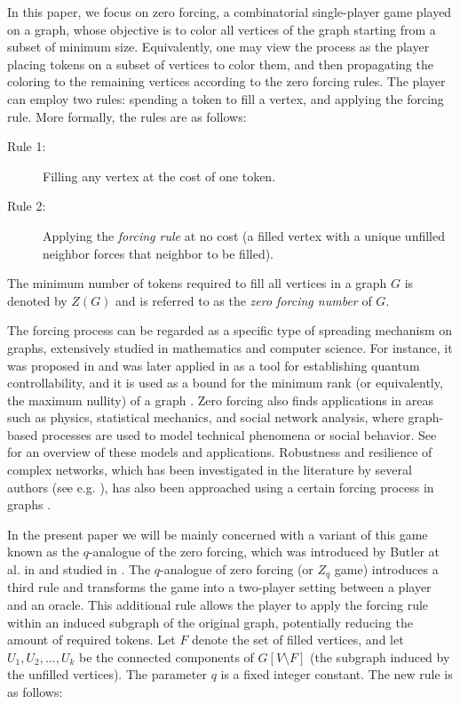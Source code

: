 \documentclass[11pt]{article}
\theoremstyle{plain}
\theoremstyle{definition}
\theoremstyle{remark}
\begin{document}
In this paper, we focus on zero forcing, a combinatorial single-player game played on a graph, whose objective is to color all vertices of the graph starting from a subset of minimum size. Equivalently, one may view the process as the player placing tokens on a subset of vertices to color them, and then propagating the coloring to the remaining vertices according to the zero forcing rules. The player can employ two rules: spending a token to fill a vertex, and applying the forcing rule. More formally, the rules are as follows:  
\begin{description}
    \item[Rule 1:] Filling any vertex at the cost of one token.
    \item[Rule 2:] Applying the \emph{forcing rule} at no cost (a filled vertex with a unique unfilled neighbor forces that neighbor to be filled).
\end{description}  
The minimum number of tokens required to fill all vertices in a graph $G$ is denoted by $Z(G)$ and is referred to as the \emph{zero forcing number} of $G$.


The forcing process can be regarded as a specific type of spreading mechanism on graphs, extensively studied in mathematics and computer science. For instance, it was proposed in \cite{PhysRevLett.99.100501} 
and was later applied in \cite{PhysRevA.79.060305} as a tool for establishing quantum controllability, and it is used as a bound for the minimum rank (or equivalently, the maximum nullity) of a graph \cite{AIMMINIMUMRANKSPECIALGRAPHSWORKGROUP20081628}. Zero forcing also finds applications in areas such as physics, statistical mechanics, and social network analysis, where graph-based processes are used to model technical phenomena or social behavior. See \cite{dynamicalsystemsZ} for an overview of these models and applications. Robustness and resilience of complex networks, which has been investigated in the literature by several authors (see e.g. \cite{AGDetal2024, JI20231}), has also been approached using a certain forcing process in graphs \cite{A2023}.
 



In the present paper we will be mainly concerned with a variant of this game known as the $q$-analogue of the zero forcing, which was introduced by Butler at al. in \cite{butler2015using} and studied in \cite{butler2020properties, fallat2024q,blanco2023z_q}. The $q$-analogue of zero forcing (or $Z_q$ game) introduces a third rule and transforms the game into a two-player setting between a player and an oracle. This additional rule allows the player to apply the forcing rule within an induced subgraph of the original graph, potentially reducing the amount of required tokens. Let $F$ denote the set of filled vertices, and let $U_1, U_2, \dots, U_k$ be the connected components of $G[V \setminus F]$ (the subgraph induced by the unfilled vertices). The parameter $q$ is a fixed integer constant. The new rule is as follows:
\end{document}
